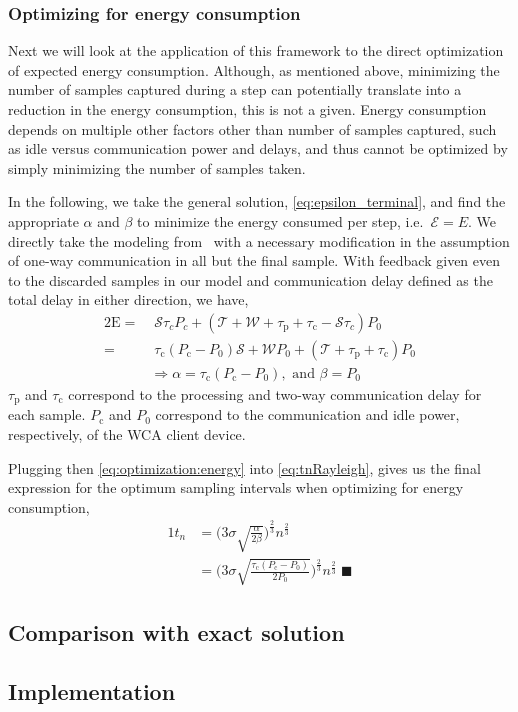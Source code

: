 \subsubsection{Optimizing for energy consumption}

Next we will look at the application of this framework to the direct optimization of expected energy consumption.
Although, as mentioned above, minimizing the number of samples captured during a step can potentially translate into a reduction in the energy consumption, this is not a given.
Energy consumption depends on multiple other factors other than number of samples captured, such as idle versus communication power and delays, and thus cannot be optimized by simply minimizing the number of samples taken.

In the following, we take the general solution, \cref{eq:epsilon_terminal}, and find the appropriate \( \alpha \) and \( \beta \) to minimize the energy consumed per step, i.e.\ \( \mathcal{E}=E \).
We directly take the modeling from~\cite{moothedath2022energy2} with a necessary modification in the assumption of one-way communication in all but the final sample.
With feedback given even to the discarded samples in our model and communication delay defined as the total delay in either direction, we have, 
\begin{alignat}{2}
    \mathrm{E}=&\;\mathcal{S}\tau_cP_c+(\mathcal{T}+\mathcal{W}+\tau_\mathrm{p}+\tau_\mathrm{c}-\mathcal{S}\tau_c)P_0\nonumber\\
    =&\;\tau_{\text{c}}(P_{\text{c}} -P_0)\mathcal{S}+\mathcal{W}P_0+(\mathcal{T}+\tau_{\text{p}} +\tau_{\text{c}}) P_0\nonumber\\
&\Rightarrow \alpha=\tau_{\text{c}}(P_{\text{c}} -P_0),\text{ and }\beta=P_0 \label{eq:optimization:energy}
\end{alignat}
\( \tau_\text{p} \) and \( \tau_\text{c} \) correspond to the processing and two-way communication delay for each sample.
\( P_\text{c} \) and \( P_0 \) correspond to the communication and idle power, respectively, of the \gls{WCA} client device.

Plugging then \cref{eq:optimization:energy} into \cref{eq:tnRayleigh}, gives us the final expression for the optimum sampling intervals when optimizing for energy consumption,
\begin{alignat}{1}
    t_n&=\Big(3\sigma\!\sqrt{\tfrac{\alpha}{2\beta}}\Big)^{\frac{2}{3}}n^{\frac{2}{3}}\nonumber\\
    &=\Big(3\sigma\!\sqrt{\tfrac{\tau_{\text{c}}(P_{\text{c}} -P_0)}{2 P_0}}\Big)^{\frac{2}{3}}n^{\frac{2}{3}}\;\blacksquare\label{eq:tnRayleigh:energy}
\end{alignat}

\subsection{Comparison with exact solution}


\subsection{Implementation}

